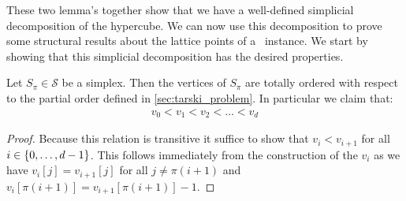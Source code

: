 These two lemma's together show that we have a well-defined simplicial decomposition of the hypercube. We can now use this decomposition to prove some structural results about the lattice points of a \Tarski\ instance. We start by showing that this simplicial decomposition has the desired properties.
\begin{lemma}
    Let $S_{\pi} \in \mathcal{S}$ be a simplex. Then the vertices of $S_{\pi}$ are totally ordered with respect to the partial order defined in \cref{sec:tarski_problem}. In particular we claim that:
    \begin{align*}
        v_0 < v_1 < v_2 < \dots < v_d
    \end{align*}
\end{lemma}
\begin{proof}
    Because this relation is transitive it suffice to show that $v_i < v_{i+1}$ for all $i \in \left\{0, \dots, d-1\right\}$. This follows immediately from the construction of the $v_i$ as we have $v_i[j] = v_{i+1}[j]$ for all $j \neq \pi(i+1)$ and $v_i[\pi(i+1)] = v_{i+1}[\pi(i+1)] - 1$.
\end{proof}
